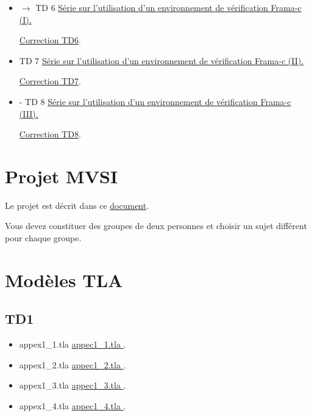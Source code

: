 \documentclass[ 12pt]{article}
\begin{document}
\begin{itemize}
       
\item[] $\longrightarrow$   TD 6
    \href{http://mery54.github.io/teaching/mvsi/lecturesnotes/newtd6.pdf}{
      Série sur l'utilisation d'un environnement de  v\'erification Frama-c 
      (I).}
    

      \href{http://mery54.github.io/teaching/mvsi/lecturesnotes/cnewtd6.pdf}{Correction 
       TD6}.
    
     
\item[]   TD 7
    \href{http://mery54.github.io/teaching/mvsi/lecturesnotes/newtd7.pdf}{
      Série sur l'utilisation d'un environnement de  v\'erification Frama-c 
      (II).}
    

      \href{http://mery54.github.io/teaching/mvsi/lecturesnotes/cnewtd7.pdf}{Correction 
       TD7}.

\item[] -   TD 8
    \href{http://mery54.github.io/teaching/mvsi/lecturesnotes/newtd8.pdf}{
      Série sur l'utilisation d'un environnement de  v\'erification Frama-c 
      (III).}
    

     \href{http://mery54.github.io/teaching/mvsi/lecturesnotes/cnewtd8.pdf}{Correction         TD8}.

     

  \end{itemize}

  
  \section{Projet MVSI}
\label{sec:project}

Le  projet est décrit   dans ce     \href{http://mery54.github.io/teaching/mvsi/lecturesnotes/projet2026.pdf}{document}.

Vous devez  constituer des groupes de deux personnes   et choisir un
sujet  différent pour chaque groupe.





  \section{Modèles TLA}
\label{sec:event-b-models}


\subsection{TD1}

 \begin{itemize}
  \item[]   appex1\_1.tla 
    \href{http://mery54.github.io/teaching/mvsi/models/appex1_1.tla}{
      appec1\_1.tla }.
      \item[]   appex1\_2.tla 
    \href{http://mery54.github.io/teaching/mvsi/models/appex1_2.tla}{
      appec1\_2.tla }.
       \item[]   appex1\_3.tla 
    \href{http://mery54.github.io/teaching/mvsi/models/appex1_3.tla}{
      appec1\_3.tla }.
          \item[]   appex1\_4.tla 
    \href{http://mery54.github.io/teaching/mvsi/models/appex1_4.tla}{
      appec1\_4.tla }.
  \end{itemize}
\end{document}
